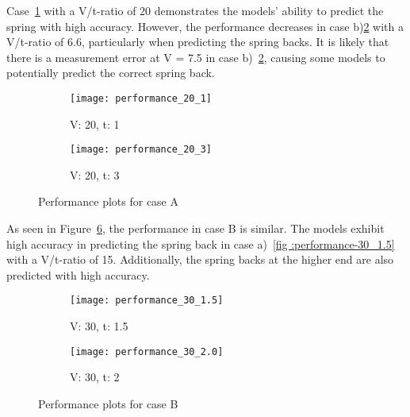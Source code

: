 Case~\ref{fig:performance-20-1} with a V/t-ratio of 20 demonstrates the models'
ability to predict the spring with high accuracy.
However, the performance decreases in case b)\ref{fig:performance-20-3} with a V/t-ratio
of 6.6, particularly when predicting the spring backs.
It is likely that there is a measurement error at V = 7.5 in case
b)~\ref{fig:performance-20-3}, causing some models to potentially predict the correct
spring back.

\begin{figure}[H]
    \begin{tcolorbox}[arc=0pt,boxrule=0.5pt]
        \begin{subfigure}{0.5\textwidth}
            \texttt{[image: performance\_20\_1]}
            \caption{V: 20, t: 1}
            \label{fig:performance-20-1}
        \end{subfigure}
        \hfill
        \begin{subfigure}{0.5\textwidth}
            \texttt{[image: performance\_20\_3]}
            \caption{V: 20, t: 3}
            \label{fig:performance-20-3}
        \end{subfigure}
    \end{tcolorbox}
    \label{fig:performance-case-a}
    \caption{Performance plots for case A}
\end{figure}

As seen in Figure~\ref{fig:performance-case-b}, the performance in case B is similar.
The models exhibit high accuracy in predicting the spring back in case a)~\ref{fig
:performance-30_1.5} with a V/t-ratio of 15. Additionally, the spring backs at the
higher end are also predicted with high accuracy.

\begin{figure}[H]
    \begin{tcolorbox}[arc=0pt,boxrule=0.5pt]
        \begin{subfigure}{0.5\textwidth}
            \texttt{[image: performance\_30\_1.5]}
            \caption{V: 30, t: 1.5}
            \label{fig:performance-30_1.5}
        \end{subfigure}
        \hfill
        \begin{subfigure}{0.5\textwidth}
            \texttt{[image: performance\_30\_2.0]}
            \caption{V: 30, t: 2}
            \label{fig:performance-30_2.0}
        \end{subfigure}
    \end{tcolorbox}
    \caption{Performance plots for case B}
    \label{fig:performance-case-b}
\end{figure}

